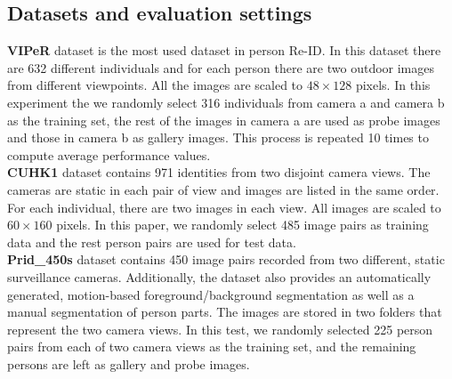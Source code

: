 \documentclass[10pt,twocolumn,letterpaper]{article}
\begin{document}
\subsection{Datasets and evaluation settings}
\noindent \textbf{VIPeR} dataset is the most used dataset in person Re-ID. In this dataset there are 632 different individuals and for each person there are two outdoor images from different viewpoints. All the images are scaled to $48\times128$ pixels. In this experiment the we randomly select 316 individuals from camera a and camera b as the training set, the rest of the images in camera a are used as probe images and those in camera b as gallery images. This process is repeated 10 times to compute average performance values.\\
\textbf{CUHK1} dataset contains 971 identities from two disjoint camera views. The cameras are static in each pair of view and images are listed in the same order. For each individual, there are two images in each view. All images are scaled to $60\times160$ pixels. In this paper, we randomly select 485 image pairs as training data and the rest person pairs are used for test data. \\
\textbf{Prid\_450s} dataset contains 450 image pairs recorded from two different, static surveillance cameras. Additionally, the dataset also provides an automatically generated, motion-based foreground/background segmentation as well as a manual segmentation of person parts. The images are stored in two folders that represent the two camera views. In this test, we randomly selected 225 person pairs from each of two camera views as the training set, and the remaining persons are left as gallery and probe images. \\
\end{document}
